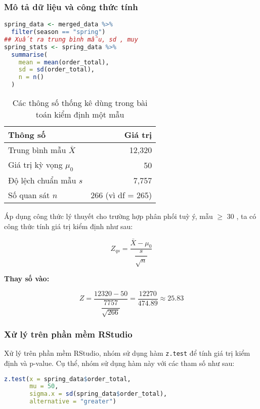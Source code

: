 \subsubsection{Mô tả dữ liệu và công thức tính}

\begin{lstlisting}[language=R, caption=Tính các thông số]
spring_data <- merged_data %>%
  filter(season == "spring")
## Xuất ra trung bình mẫu, sd , muy
spring_stats <- spring_data %>%
  summarise(
    mean = mean(order_total),
    sd = sd(order_total),
    n = n()
  )  
\end{lstlisting}

\begin{table}[h!]
\centering
\begin{tabular}{|l|r|}
\hline
\textbf{Thông số} & \textbf{Giá trị} \\
\hline
Trung bình mẫu \( \bar{X} \) & 12,320 \\
Giá trị kỳ vọng \( \mu_0 \) & 50 \\
Độ lệch chuẩn mẫu \( s \) & 7,757 \\
Số quan sát \( n \) & 266 (vì df = 265) \\
\hline
\end{tabular}
\caption{Các thông số thống kê dùng trong bài toán kiểm định một mẫu}
\label{tab:thongso}
\end{table}

Áp dụng công thức lý thuyết cho trường hợp phân phối tuỳ ý, mẫu $\geq$ $30$ ,  ta có công thức tính giá trị kiểm định như sau:
\begin{boxH}
\[
Z_{qs} = \frac{\bar{X} - \mu_0}{\dfrac{s}{\sqrt{n}}}
\]

\textbf{Thay số vào:}

\[
Z = \frac{12320 - 50}{\dfrac{7757}{\sqrt{266}}}
= \frac{12270}{474.89} \approx 25.83
\]
\end{boxH}

\subsubsection{Xử lý trên phần mềm RStudio}
Xử lý trên phần mềm RStudio, nhóm sử dụng hàm \texttt{z.test} để tính giá trị kiểm định và p-value. Cụ thể, nhóm sử dụng hàm này với các tham số như sau:

\begin{lstlisting}[language=R, caption=Kiểm định một mẫu]
z.test(x = spring_data$order_total,
       mu = 50,
       sigma.x = sd(spring_data$order_total),
       alternative = "greater")
\end{lstlisting}


